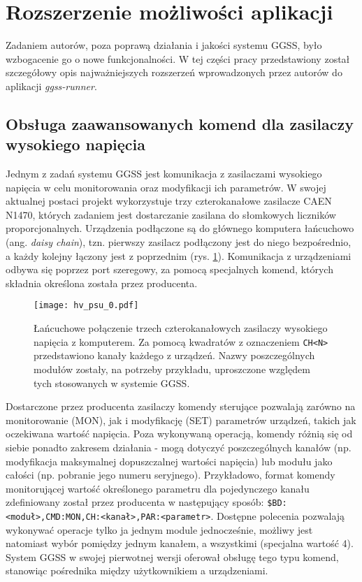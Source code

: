 \clearpage
\section{Rozszerzenie możliwości aplikacji}
Zadaniem autorów, poza poprawą działania i jakości systemu GGSS, było wzbogacenie go o nowe funkcjonalności. W tej części pracy przedstawiony został szczegółowy opis najważniejszych rozszerzeń wprowadzonych przez autorów do aplikacji \emph{ggss-runner}. 

\subsection{Obsługa zaawansowanych komend dla zasilaczy wysokiego napięcia} \label{ch:hv}
Jednym z zadań systemu GGSS jest komunikacja z zasilaczami wysokiego napięcia w celu monitorowania oraz modyfikacji ich parametrów. W swojej aktualnej postaci projekt wykorzystuje trzy czterokanałowe zasilacze CAEN N1470, których zadaniem jest dostarczanie zasilana do słomkowych liczników proporcjonalnych. Urządzenia podłączone są do głównego komputera łańcuchowo (ang. \emph{daisy chain}), tzn. pierwszy zasilacz podłączony jest do niego bezpośrednio, a każdy kolejny łączony jest z poprzednim (rys. \ref{fig:psu0}). Komunikacja z urządzeniami odbywa się poprzez port szeregowy, za pomocą specjalnych komend, których składnia określona została przez producenta. 

\begin{figure}[H]
\centering
\texttt{[image: hv\_psu\_0.pdf]}
\caption{Łańcuchowe połączenie trzech czterokanałowych zasilaczy wysokiego napięcia z komputerem. Za pomocą kwadratów z oznaczeniem \lstinline{CH<N>} przedstawiono kanały każdego z urządzeń. Nazwy poszczególnych modułów zostały, na potrzeby przykładu, uproszczone względem tych stosowanych w systemie GGSS.}
\label{fig:psu0}
\end{figure}

Dostarczone przez producenta zasilaczy komendy sterujące pozwalają zarówno na monitorowanie (MON), jak i modyfikację (SET) parametrów urządzeń, takich jak oczekiwana wartość napięcia. Poza wykonywaną operacją, komendy różnią się od siebie ponadto zakresem działania - mogą dotyczyć poszczególnych kanałów (np. modyfikacja maksymalnej dopuszczalnej wartości napięcia) lub modułu jako całości (np. pobranie jego numeru seryjnego). Przykładowo, format komendy monitorującej wartość określonego parametru dla pojedynczego kanału zdefiniowany został przez producenta w następujący sposób: \lstinline{$BD:<moduł>,CMD:MON,CH:<kanał>,PAR:<parametr>}. Dostępne polecenia pozwalają wykonywać operacje tylko ja jednym module jednocześnie, możliwy jest natomiast wybór pomiędzy jednym kanałem, a wszystkimi (specjalna wartość 4). System GGSS w swojej pierwotnej wersji oferował obsługę tego typu komend, stanowiąc pośrednika między użytkownikiem a urządzeniami.

